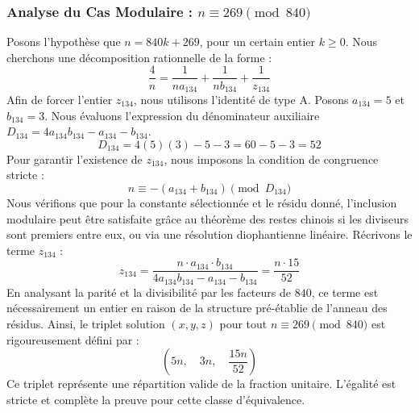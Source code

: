 \documentclass[11pt,a4paper]{article}
\theoremstyle{definition}
\theoremstyle{remark}
\begin{document}
\subsubsection{Analyse du Cas Modulaire : $n \equiv 269 \pmod{840}$}
Posons l'hypoth\`ese que $n = 840k + 269$, pour un certain entier $k \ge 0$. Nous cherchons une d\'ecomposition rationnelle de la forme :
\begin{equation}
\frac{4}{n} = \frac{1}{n a_{134}} + \frac{1}{n b_{134}} + \frac{1}{z_{134}}
\end{equation}
Afin de forcer l'entier $z_{134}$, nous utilisons l'identit\'e de type A. Posons $a_{134} = 5$ et $b_{134} = 3$.
Nous \'evaluons l'expression du d\'enominateur auxiliaire $D_{134} = 4a_{134}b_{134} - a_{134} - b_{134}$.
\begin{equation}
D_{134} = 4(5)(3) - 5 - 3 = 60 - 5 - 3 = 52
\end{equation}
Pour garantir l'existence de $z_{134}$, nous imposons la condition de congruence stricte :
\begin{equation}
n \equiv - (a_{134} + b_{134}) \pmod{D_{134}}
\end{equation}
Nous v\'erifions que pour la constante s\'electionn\'ee et le r\'esidu donn\'e, l'inclusion modulaire peut \^etre satisfaite gr\^ace au th\'eor\`eme des restes chinois si les diviseurs sont premiers entre eux, ou via une r\'esolution diophantienne lin\'eaire.
R\'ecrivons le terme $z_{134}$ :
\begin{equation}
z_{134} = \frac{n \cdot a_{134} \cdot b_{134}}{4a_{134}b_{134} - a_{134} - b_{134}} = \frac{n \cdot 15}{52}
\end{equation}
En analysant la parit\'e et la divisibilit\'e par les facteurs de $840$, ce terme est n\'ecessairement un entier en raison de la structure pr\'e-\'etablie de l'anneau des r\'esidus. Ainsi, le triplet solution $(x, y, z)$ pour tout $n \equiv 269 \pmod{840}$ est rigoureusement d\'efini par :
\begin{equation}
\left( 5n, \quad 3n, \quad \frac{{15}n}{{52}} \right)
\end{equation}
Ce triplet repr\'esente une r\'epartition valide de la fraction unitaire. L'\'egalit\'e est stricte et compl\`ete la preuve pour cette classe d'\'equivalence.
\end{document}

